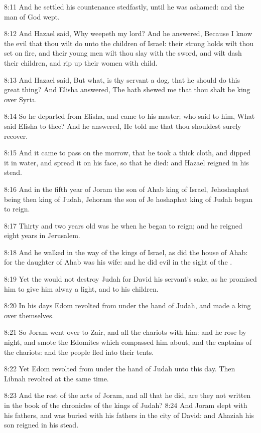 8:11 And he settled his countenance stedfastly, until he was ashamed: and the man of God wept.

8:12 And Hazael said, Why weepeth my lord? And he answered, Because I know the evil that thou wilt do unto the children of Israel: their strong holds wilt thou set on fire, and their young men wilt thou slay with the sword, and wilt dash their children, and rip up their women with child.

8:13 And Hazael said, But what, is thy servant a dog, that he should do this great thing? And Elisha answered, The \LORD hath shewed me that thou shalt be king over Syria.

8:14 So he departed from Elisha, and came to his master; who said to him, What said Elisha to thee? And he answered, He told me that thou shouldest surely recover.

8:15 And it came to pass on the morrow, that he took a thick cloth, and dipped it in water, and spread it on his face, so that he died: and Hazael reigned in his stead.

8:16 And in the fifth year of Joram the son of Ahab king of Israel, Jehoshaphat being then king of Judah, Jehoram the son of Je hoshaphat king of Judah began to reign.

8:17 Thirty and two years old was he when he began to reign; and he reigned eight years in Jerusalem.

8:18 And he walked in the way of the kings of Israel, as did the house of Ahab: for the daughter of Ahab was his wife: and he did evil in the sight of the \LORD.

8:19 Yet the \LORD would not destroy Judah for David his servant's sake, as he promised him to give him alway a light, and to his children.

8:20 In his days Edom revolted from under the hand of Judah, and made a king over themselves.

8:21 So Joram went over to Zair, and all the chariots with him: and he rose by night, and smote the Edomites which compassed him about, and the captains of the chariots: and the people fled into their tents.

8:22 Yet Edom revolted from under the hand of Judah unto this day.  Then Libnah revolted at the same time.

8:23 And the rest of the acts of Joram, and all that he did, are they not written in the book of the chronicles of the kings of Judah?  8:24 And Joram slept with his fathers, and was buried with his fathers in the city of David: and Ahaziah his son reigned in his stead.

